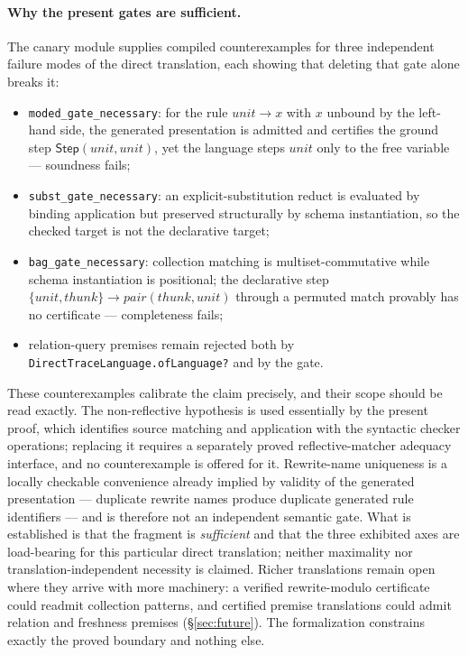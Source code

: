 \documentclass[]{article}
\theoremstyle{remark}
\newcommand{\code}[1]{\texttt{#1}}
\begin{document}
\paragraph{Why the present gates are sufficient.}
The canary module supplies compiled counterexamples for three independent
failure modes of the direct translation, each showing that deleting that
gate alone breaks it:
\begin{itemize}
\item \code{moded\_gate\_necessary}: for the rule $\mathit{unit}\to x$ with
  $x$ unbound by the left-hand side, the generated presentation is admitted
  and certifies the ground step
  $\mathsf{Step}(\mathit{unit},\mathit{unit})$, yet the language steps
  $\mathit{unit}$ only to the free variable --- soundness fails;
\item \code{subst\_gate\_necessary}: an explicit-substitution reduct is
  evaluated by binding application but preserved structurally by schema
  instantiation, so the checked target is not the declarative target;
\item \code{bag\_gate\_necessary}: collection matching is
  multiset-commutative while schema instantiation is positional; the
  declarative step $\{\mathit{unit},\mathit{thunk}\}\to
  \mathit{pair}(\mathit{thunk},\mathit{unit})$ through a permuted match
  provably has no certificate --- completeness fails;
\item relation-query premises remain rejected both by
  \code{DirectTraceLanguage.ofLanguage?} and by the gate.
\end{itemize}

These counterexamples calibrate the claim precisely, and their scope should
be read exactly.  The non-reflective hypothesis is used essentially by the
present proof, which identifies source matching and application with the
syntactic checker operations; replacing it requires a separately proved
reflective-matcher adequacy interface, and no counterexample is offered for
it.  Rewrite-name uniqueness is a locally checkable convenience already
implied by validity of the generated presentation --- duplicate rewrite
names produce duplicate generated rule identifiers --- and is therefore not
an independent semantic gate.  What is established is that the fragment is
\emph{sufficient} and that the three exhibited axes are load-bearing for
this particular direct translation; neither maximality nor
translation-independent necessity is claimed.  Richer
translations remain open where they arrive with more machinery: a verified
rewrite-modulo certificate could readmit collection patterns, and certified
premise translations could admit relation and freshness premises
(\S\ref{sec:future}).  The formalization constrains exactly the proved
boundary and nothing else.
\end{document}
